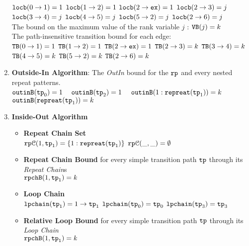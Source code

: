 \begin{enumerate}
      \\  
      $\mathtt{locb}(0 \to 1) = 1$ 
      \quad $\mathtt{locb}(1 \to 2) = 1$
      \quad $\mathtt{locb}(2 \to \mathtt{ex}) = 1$
      \quad $\mathtt{locb}(2 \to 3) = j$ 
      \quad $\mathtt{locb}(3 \to 4) = j$
      \quad $\mathtt{locb}(4 \to 5) = j$ 
      \quad $\mathtt{locb}(5 \to 2) = j$ 
      \quad $\mathtt{locb}(2 \to 6) = j$ 
  \\
  The bound on the maximum value of the rank variable $j$ : ${\mathtt{VB}}(j) = k$
  \\
  The path-insensitive transition bound for each edge:
  \\
  ${\mathtt{TB}}(0 \to 1) = 1$ 
  \quad ${\mathtt{TB}}(1 \to 2) = 1$
  \quad ${\mathtt{TB}}(2 \to \mathtt{ex}) = 1$ 
  \quad ${\mathtt{TB}}(2 \to 3) = k$ 
  \quad ${\mathtt{TB}}(3 \to 4) = k$
  \quad ${\mathtt{TB}}(4 \to 5) = k$ 
  \quad ${\mathtt{TB}}(5 \to 2) = k$ 
  \quad ${\mathtt{TB}}(2 \to 6) = k$ 
  \item \textbf{Outside-In Algorithm}: The \emph{OutIn} bound for the $\mathtt{rp}$ and every nested repeat patterns.
  \\
  $\mathtt{outinB}(\mathtt{tp}_0) = 1$
  ~
  $\mathtt{outinB}(\mathtt{tp}_2) = 1$
  ~
  $\mathtt{outinB}({1: \mathtt{repreat}(\mathtt{tp}_1)}) = k $
  ~
  $\mathtt{outinB}(\mathtt{repreat}(\mathtt{tp}_1)) = k $
  \item \textbf{Inside-Out Algorithm}
  \begin{itemize}
    \item \textbf{Repeat Chain Set}
    \\
    $\mathtt{rp}\mathcal{C}(1, \mathtt{tp}_1) = \{1: \mathtt{repreat}(\mathtt{tp}_1)\}$ 
    \quad
    $\mathtt{rp}\mathcal{C}(\_, \_) = \emptyset$ 
    \item \textbf{Repeat Chain Bound} for every simple transition path $\mathtt{tp}$ through its \emph{Repeat Chain}s
    \\
    $\mathtt{rpchB}(1, \mathtt{tp}_1) = k$
    \item \textbf{Loop Chain}
    \\
    $\mathtt{lpchain}(\mathtt{tp}_1) = 1\to \mathtt{tp}_1$ \quad
    $\mathtt{lpchain}(\mathtt{tp}_0) = \mathtt{tp}_0$ \quad
    $\mathtt{lpchain}(\mathtt{tp}_3) = \mathtt{tp}_3$ 
    \item \textbf{{Relative Loop Bound}} for every simple transition path $\mathtt{tp}$ through its \emph{Loop Chain}
    \\
    $\mathtt{rpchB}(1, \mathtt{tp}_1) =   k$

\end{itemize}
\end{enumerate}
